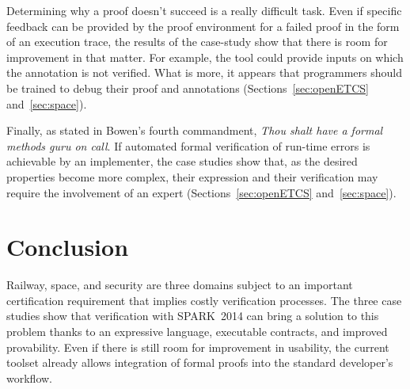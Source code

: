 \documentclass[10pt,a4paper,twocolumn]{article}
\newcommand{\newspark}{SPARK~2014\xspace}
\begin{document}
Determining why a proof doesn't succeed is a really difficult
task. Even if specific feedback can be provided by the proof
environment for a failed proof in the form of an execution trace, the
results of the case-study show that there is room for improvement in
that matter. For example, the tool could provide inputs on which the
annotation is not verified.  What is more, it appears that programmers
should be trained to debug their proof and annotations
(Sections~\ref{sec:openETCS} and~\ref{sec:space}).

Finally, as stated in Bowen's fourth commandment, \emph{Thou shalt
  have a formal methods guru on call}. If automated formal
verification of run-time errors is achievable by an implementer, the
case studies show that, as the desired properties become more complex,
their expression and their verification may require the involvement of
an expert (Sections~\ref{sec:openETCS} and~\ref{sec:space}).

\section{Conclusion}

Railway, space, and security are three domains subject to an important
certification requirement that implies costly verification
processes. The three case studies show that verification with
\newspark can bring a solution to this problem thanks to an expressive
language, executable contracts, and improved provability. Even if
there is still room for improvement in usability, the current toolset
already allows integration of formal proofs into the standard
developer's workflow.



\end{document}
